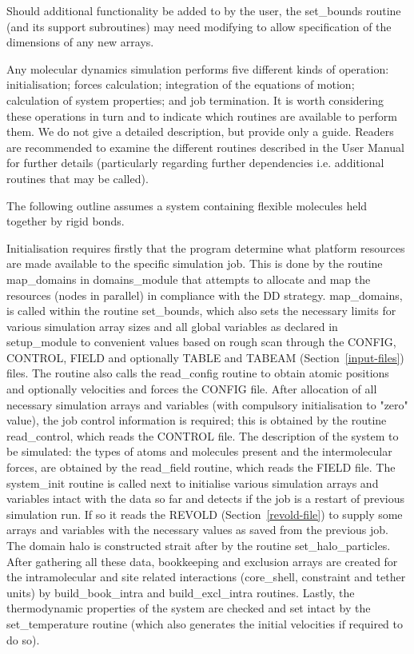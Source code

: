 Should additional functionality be added to \D by the user, the
{\sc set\_bounds} routine (and its support subroutines) may need
modifying to allow specification of the dimensions of any new
arrays.

Any molecular dynamics simulation performs five different kinds of
operation: initialisation; forces calculation; integration of the
equations of motion; calculation of system properties; and job
termination.  It is worth considering these operations in turn and
to indicate which \D routines are available to perform them.  We do
not give a detailed description, but provide only a guide.  Readers
are recommended to examine the different routines described in the
\D User Manual for further details (particularly regarding further
dependencies i.e. additional routines that may be called).

The following outline assumes a system containing flexible molecules
held together by rigid bonds.

Initialisation requires firstly that the program determine what
platform resources are made available to the specific simulation
job.  This is done by the \D routine {\sc map\_domains} in
{\sc domains\_module} that attempts to allocate and map the
resources (nodes in parallel) in compliance with the DD
strategy.  {\sc map\_domains}, is called
within the routine {\sc set\_bounds}, which also sets the necessary
limits for various simulation array sizes and all global
variables as declared in {\sc setup\_module} to convenient values
based on rough scan through the CONFIG, CONTROL, FIELD and optionally
TABLE and TABEAM (Section~\ref{input-files}) files.  The routine also
calls the {\sc read\_config} routine to obtain atomic positions and
optionally velocities and forces the CONFIG file.  After allocation
of all necessary simulation arrays and variables (with compulsory
initialisation to "zero" value), the job control information is
required; this is obtained by the routine {\sc read\_control}, which
reads the CONTROL file.  The description of the system to be
simulated: the types of atoms and molecules present and the
intermolecular forces, are obtained by the {\sc read\_field} routine,
which reads the FIELD file.  The {\sc system\_init} routine is
called next to initialise various simulation arrays and variables
intact with the data so far and detects if the job is a restart of
previous simulation run.  If so it reads the REVOLD (Section~\ref{revold-file})
to supply some arrays and variables with the
necessary values as saved from the previous job.  The domain halo is
constructed strait after by the routine {\sc set\_halo\_particles}.
After gathering all these data, bookkeeping and exclusion arrays are
created for the intramolecular and site related interactions
(core\_shell, constraint and tether units) by {\sc build\_book\_intra}
and {\sc build\_excl\_intra} routines.  Lastly, the thermodynamic
properties of the system are checked and set intact by the
{\sc set\_temperature} routine (which also generates the initial
velocities if required to do so).

